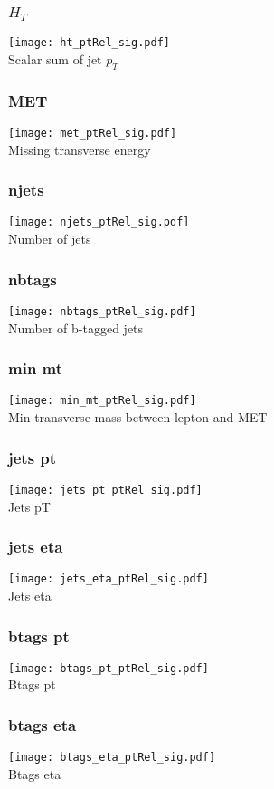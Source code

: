 \documentclass{beamer}
\begin{document}
\begin{frame}
\frametitle{$H_T$}
\texttt{[image: ht\_ptRel\_sig.pdf]} \\
Scalar sum of jet $p_T$
\end{frame}

\begin{frame}
\frametitle{MET}
\texttt{[image: met\_ptRel\_sig.pdf]} \\
Missing transverse energy
\end{frame}

\begin{frame}
\frametitle{njets}
\texttt{[image: njets\_ptRel\_sig.pdf]} \\
Number of jets
\end{frame}

\begin{frame}
\frametitle{nbtags}
\texttt{[image: nbtags\_ptRel\_sig.pdf]} \\
Number of b-tagged jets
\end{frame}

\begin{frame}
\frametitle{min mt}
\texttt{[image: min\_mt\_ptRel\_sig.pdf]} \\
Min transverse mass between lepton and MET
\end{frame}

\begin{frame}
\frametitle{jets pt}
\texttt{[image: jets\_pt\_ptRel\_sig.pdf]} \\
Jets pT
\end{frame}

\begin{frame}
\frametitle{jets eta}
\texttt{[image: jets\_eta\_ptRel\_sig.pdf]} \\
Jets eta
\end{frame}

\begin{frame}
\frametitle{btags pt}
\texttt{[image: btags\_pt\_ptRel\_sig.pdf]} \\
Btags pt
\end{frame}

\begin{frame}
\frametitle{btags eta}
\texttt{[image: btags\_eta\_ptRel\_sig.pdf]} \\
Btags eta
\end{frame}
\end{document}
